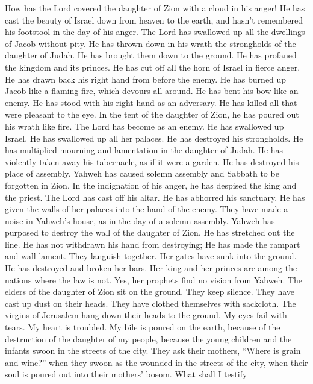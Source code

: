  How has the Lord covered the daughter of Zion with a cloud
in his anger! He has cast the beauty of Israel down from heaven to the
earth, and hasn't remembered his footstool in the day of his anger.
 The Lord has swallowed up all the dwellings of Jacob
without pity. He has thrown down in his wrath the strongholds of the
daughter of Judah. He has brought them down to the ground. He has
profaned the kingdom and its princes.  He has cut off all
the horn of Israel in fierce anger. He has drawn back his right hand
from before the enemy. He has burned up Jacob like a flaming fire, which
devours all around.  He has bent his bow like an enemy. He
has stood with his right hand as an adversary. He has killed all that
were pleasant to the eye. In the tent of the daughter of Zion, he has
poured out his wrath like fire.  The Lord has become as an
enemy. He has swallowed up Israel. He has swallowed up all her palaces.
He has destroyed his strongholds. He has multiplied mourning and
lamentation in the daughter of Judah.  He has violently
taken away his tabernacle, as if it were a garden. He has destroyed his
place of assembly. Yahweh has caused solemn assembly and Sabbath to be
forgotten in Zion. In the indignation of his anger, he has despised the
king and the priest.  The Lord has cast off his altar. He
has abhorred his sanctuary. He has given the walls of her palaces into
the hand of the enemy. They have made a noise in Yahweh's house, as in
the day of a solemn assembly.  Yahweh has purposed to
destroy the wall of the daughter of Zion. He has stretched out the line.
He has not withdrawn his hand from destroying; He has made the rampart
and wall lament. They languish together.  Her gates have
sunk into the ground. He has destroyed and broken her bars. Her king and
her princes are among the nations where the law is not. Yes, her
prophets find no vision from Yahweh.  The elders of the
daughter of Zion sit on the ground. They keep silence. They have cast up
dust on their heads. They have clothed themselves with sackcloth. The
virgins of Jerusalem hang down their heads to the ground. 
My eyes fail with tears. My heart is troubled. My bile is poured on the
earth, because of the destruction of the daughter of my people, because
the young children and the infants swoon in the streets of the city.
 They ask their mothers, ``Where is grain and wine?'' when
they swoon as the wounded in the streets of the city, when their soul is
poured out into their mothers' bosom.  What shall I testify
